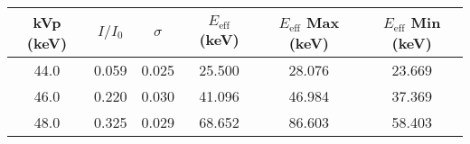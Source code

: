 \begin{tabular}{cccccc}
\toprule
 kVp (keV) &  $I/I_0$ &  $\sigma$ &  $E_{\text{eff}}$ (keV) &  $E_{\text{eff}}$ Max (keV) &  $E_{\text{eff}}$ Min (keV) \\
\midrule
      44.0 &               0.059 &                                  0.025 &                  25.500 &                      28.076 &                      23.669 \\
      46.0 &               0.220 &                                  0.030 &                  41.096 &                      46.984 &                      37.369 \\
      48.0 &               0.325 &                                  0.029 &                  68.652 &                      86.603 &                      58.403 \\
\bottomrule
\end{tabular}
